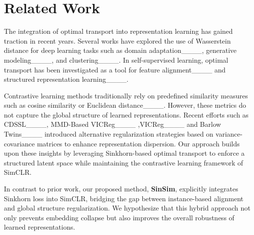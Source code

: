 \section{Related Work}
The integration of optimal transport into representation learning has gained traction in recent years. Several works have explored the use of Wasserstein distance for deep learning tasks such as domain adaptation____, generative modeling____, and clustering____. In self-supervised learning, optimal transport has been investigated as a tool for feature alignment____ and structured representation learning____.

Contrastive learning methods traditionally rely on predefined similarity measures such as cosine similarity or Euclidean distance____. However, these metrics do not capture the global structure of learned representations. Recent efforts such as CDSSL____, MMD-Based VICReg____ ,VICReg____ and Barlow Twins____ introduced alternative regularization strategies based on variance-covariance matrices to enhance representation dispersion. Our approach builds upon these insights by leveraging Sinkhorn-based optimal transport to enforce a structured latent space while maintaining the contrastive learning framework of SimCLR.

In contrast to prior work, our proposed method, \textbf{SinSim}, explicitly integrates Sinkhorn loss into SimCLR, bridging the gap between instance-based alignment and global structure regularization. We hypothesize that this hybrid approach not only prevents embedding collapse but also improves the overall robustness of learned representations.